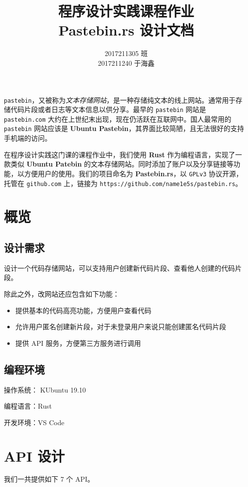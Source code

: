 \documentclass[ichigo,normal,cn]{elegantnote}
\title{程序设计实践课程作业 \\ 
Pastebin.rs 设计文档}
\author{2017211305 班 \\ 2017211240 于海鑫}
\newcommand{\code}[1]{\colorbox{light-gray}{\texttt{#1}}}
\begin{document}
\maketitle

\code{pastebin}，又被称为\emph{文本存储网站}，是一种存储纯文本的线上网站。通常用于存储代码片段或者日志等文本信息以供分享。最早的 \code{pastebin} 网站是 \code{pastebin.com} 大约在上世纪末出现，现在仍活跃在互联网中。国人最常用的 \code{pastebin} 网站应该是 \textbf{Ubuntu Pastebin}，其界面比较简陋，且无法很好的支持手机端的访问。

在程序设计实践这门课的课程作业中，我们使用 \textbf{Rust} 作为编程语言，实现了一款类似 \textbf{Ubuntu Patebin} 的文本存储网站。同时添加了账户以及分享链接等功能，以方便用户的使用。我们的项目命名为 \textbf{Pastebin.rs}，以 \texttt{GPLv3} 协议开源，托管在 \code{github.com} 上，链接为 \texttt{https://github.com/name1e5s/pastebin.rs}。

\section{概览}

\subsection{设计需求}
设计一个代码存储网站，可以支持用户创建新代码片段、查看他人创建的代码片段。

除此之外，改网站还应包含如下功能：
\begin{itemize}
    \item 提供基本的代码高亮功能，方便用户查看代码
    \item 允许用户匿名创建新片段，对于未登录用户来说只能创建匿名代码片段
    \item 提供 API 服务，方便第三方服务进行调用
\end{itemize}

\subsection{编程环境}

操作系统： KUbuntu 19.10

编程语言：Rust

开发环境：VS Code

\section{API 设计}

我们一共提供如下 7 个 API。
\end{document}
